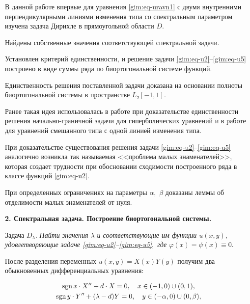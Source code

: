 В данной работе впервые для уравнения \eqref{gim:eq-uravn1} с двумя внутренними перпендикулярными линиями изменения типа со спектральным параметром изучена задача Дирихле в прямоугольной области $D.$ 

Найдены собственные значения соответствующей спектральной задачи. 

Установлен критерий единственности, и решение задачи \eqref{gim:eq-u2}--\eqref{gim:eq-u5} построено в виде суммы ряда по биортогональной системе функций. 

Единственность решения поставленной задачи доказана на основании полноты биортогональной системы в пространстве $L_2[-1, 1].$ 

Ранее такая идея использовалась в работе \cite{gim:bib:iljin} при доказательстве единственности решения начально-граничной задачи для гиперболических уравнений и в работе \cite{gim:bib:sab} для уравнений смешанного типа с одной линией изменения типа. 

При доказательстве существования решения задачи \eqref{gim:eq-u2}--\eqref{gim:eq-u5} аналогично \cite{gim:bib:arnold, gim:bib:lomov2, gim:bib:sab} возникла так называемая <<проблема малых знаменателей>>, которая создает трудности при обосновании сходимости построенного ряда в классе функций \eqref{gim:eq-u2}. 

При определенных ограничениях на параметры $\alpha,$ $\beta$ доказаны леммы об отделимости малых знаменателей от нуля.



\smallskip



\pagebreak



{\bf 2. Спектральная задача. Построение биортогональной системы.}



\smallskip



{\small \sc Задача $ D_\lambda$.} \it Найти значения $\lambda$ и соответствующие им функции $u(x,y),$ удовлетворяющие задаче \eqref{gim:eq-u2}--\eqref{gim:eq-u5}$,$ где $\varphi(x)=\psi(x)\equiv 0.$ \rm



\smallskip



После разделения переменных $u(x,y)=X(x)Y(y)$ получим два обыкновенных дифференциальных уравнения:

\begin{gather}

\mathop{\rm sgn}x\cdot X''+d\cdot X=0,\quad x\in (-1, 0)\cup (0, 1),\label{gim:eq-uravn2}\\

\mathop{\rm sgn}y\cdot Y''+(\lambda-d)Y=0,\quad y\in (-\alpha, 0)\cup(0, \beta),\label{gim:eq-uravn3}

\end{gather}

